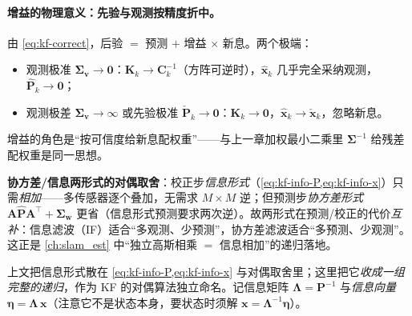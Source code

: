 \paragraph{增益的物理意义：先验与观测按精度折中。}
由 \cref{eq:kf-correct}，后验 $=$ 预测 $+$ 增益 $\times$ 新息。两个极端：
\begin{itemize}
  \item 观测极准 $\boldsymbol{\Sigma}_{\mathbf{v}}\to\mathbf{0}$：$\mathbf{K}_k\to\mathbf{C}_k^{-1}$（方阵可逆时），$\hat{\mathbf{x}}_k$ 几乎完全采纳观测，$\hat{\mathbf{P}}_k\to\mathbf{0}$；
  \item 观测极差 $\boldsymbol{\Sigma}_{\mathbf{v}}\to\infty$ 或先验极准 $\check{\mathbf{P}}_k\to\mathbf{0}$：$\mathbf{K}_k\to\mathbf{0}$，$\hat{\mathbf{x}}_k\to\check{\mathbf{x}}_k$，忽略新息。
\end{itemize}
增益的角色是“按可信度给新息配权重”——与上一章加权最小二乘里 $\boldsymbol{\Sigma}^{-1}$ 给残差配权重是同一思想\cite{barfoot2024state}。

\begin{insight}
\textbf{协方差/信息两形式的对偶取舍}：校正步\emph{信息形式}（\cref{eq:kf-info-P,eq:kf-info-x}）只需\emph{相加}——多传感器逐个叠加，无需求 $M\times M$ 逆；但预测步\emph{协方差形式} $\mathbf{A}\hat{\mathbf{P}}\mathbf{A}^\top+\boldsymbol{\Sigma}_{\mathbf{w}}$ 更省（信息形式预测要求两次逆）。故两形式在预测/校正的代价\emph{互补}：信息滤波（IF）适合“多观测、少预测”，协方差滤波适合“多预测、少观测”。这正是 \cref{ch:slam_est} 中“独立高斯相乘 $=$ 信息相加”的递归落地。
\end{insight}

上文把信息形式散在 \cref{eq:kf-info-P,eq:kf-info-x} 与对偶取舍里；这里把它\emph{收成一组完整的递归}，作为 KF 的对偶算法独立命名。记信息矩阵 $\boldsymbol{\Lambda}=\mathbf{P}^{-1}$ 与\emph{信息向量} $\boldsymbol{\eta}=\boldsymbol{\Lambda}\,\mathbf{x}$（注意它不是状态本身，要状态时须解 $\mathbf{x}=\boldsymbol{\Lambda}^{-1}\boldsymbol{\eta}$）。

